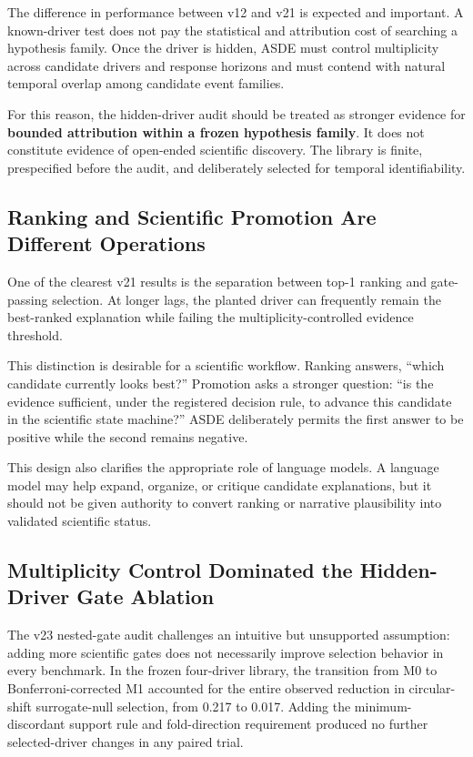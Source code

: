 \documentclass{ieeeaccess}
\begin{document}
The difference in performance between v12 and v21 is expected and important. A known-driver test does not pay the statistical and attribution cost of searching a hypothesis family. Once the driver is hidden, ASDE must control multiplicity across candidate drivers and response horizons and must contend with natural temporal overlap among candidate event families.

For this reason, the hidden-driver audit should be treated as stronger evidence for \textbf{bounded attribution within a frozen hypothesis family}. It does not constitute evidence of open-ended scientific discovery. The library is finite, prespecified before the audit, and deliberately selected for temporal identifiability.

\subsection{Ranking and Scientific Promotion Are Different Operations}\label{ranking-and-scientific-promotion-are-different-operations}

One of the clearest v21 results is the separation between top-1 ranking and gate-passing selection. At longer lags, the planted driver can frequently remain the best-ranked explanation while failing the multiplicity-controlled evidence threshold.

This distinction is desirable for a scientific workflow. Ranking answers, ``which candidate currently looks best?'' Promotion asks a stronger question: ``is the evidence sufficient, under the registered decision rule, to advance this candidate in the scientific state machine?'' ASDE deliberately permits the first answer to be positive while the second remains negative.

This design also clarifies the appropriate role of language models. A language model may help expand, organize, or critique candidate explanations, but it should not be given authority to convert ranking or narrative plausibility into validated scientific status.

\subsection{Multiplicity Control Dominated the Hidden-Driver Gate Ablation}\label{multiplicity-control-dominated-the-hidden-driver-gate-ablation}

The v23 nested-gate audit challenges an intuitive but unsupported assumption: adding more scientific gates does not necessarily improve selection behavior in every benchmark. In the frozen four-driver library, the transition from M0 to Bonferroni-corrected M1 accounted for the entire observed reduction in circular-shift surrogate-null selection, from 0.217 to 0.017. Adding the minimum-discordant support rule and fold-direction requirement produced no further selected-driver changes in any paired trial.
\end{document}
